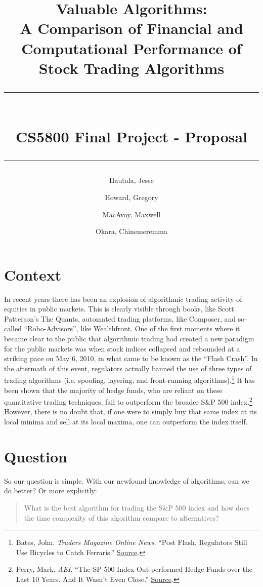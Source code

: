 \documentclass[12pt,english]{article}
\title{
    \textbf{Valuable Algorithms:}\\
    A Comparison of Financial and Computational Performance of Stock Trading Algorithms\\
    \rule[3mm]{\textwidth}{1pt}\\
    \large CS5800 Final Project - Proposal\\
    \rule{\textwidth}{1pt}
}
\author{Hautala, Jesse \and Howard, Gregory \and MacAvoy, Maxwell \and Okara, Chinemeremma}
\begin{document}
\maketitle

\section*{Context}
In recent years there has been an explosion of algorithmic trading activity of equities in public markets. This is clearly visible through books, like Scott Patterson’s The Quants, automated trading platforms, like Composer, and so-called “Robo-Advisors”, like Wealthfront. One of the first moments where it became clear to the public that algorithmic trading had created a new paradigm for the public markets was when stock indices collapsed and rebounded at a striking pace on May 6, 2010, in what came to be known as the “Flash Crash”. In the aftermath of this event, regulators actually banned the use of three types of trading algorithms (i.e. spoofing, layering, and front-running algorithms).\footnote{Bates, John. \textit{Traders Magazine Online News}. ``Post Flash, Regulators Still Use Bicycles to Catch Ferraris.'' \href{https://web.archive.org/web/20180125134559/http://www.tradersmagazine.com/news/technology/post-flash-crash-regulators-still-use-bicycles-to-catch-ferraris-113762-1.html?ET=tradersmagazine\%3Ae4256762\%3A1181926a\%3A&st=email}{Source}.}
\newline\newline
It has been shown that the majority of hedge funds, who are reliant on these quantitative trading techniques, fail to outperform the broader S\&P 500 index.\footnote{Perry, Mark. \textit{AEI}. ``The SP 500 Index Out-performed Hedge Funds over the Last 10 Years. And It Wasn’t Even Close.'' \href{https://www.aei.org/carpe-diem/the-sp-500-index-out-performed-hedge-funds-over-the-last-10-years-and-it-wasnt-even-close/}{Source}.} However, there is no doubt that, if one were to simply buy that same index at its local minima and sell at its local maxima, one can outperform the index itself.
\newpage
\section*{Question}
So our question is simple. With our newfound knowledge of algorithms, can we do better? Or more explicitly:
\begin{quote}
What is the best algorithm for trading the S\&P 500 index and how does the time complexity of this algorithm compare to alternatives?
\end{quote}
\end{document}
